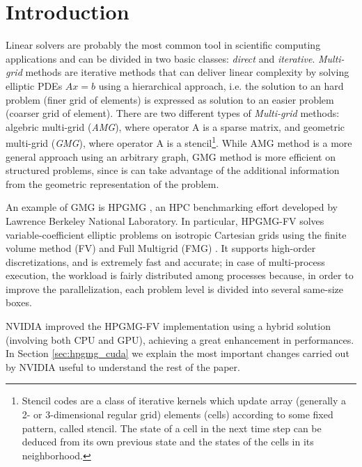 \documentclass[conference]{IEEEtran}
\begin{document}
\section{Introduction}\label{sec:introduction}
Linear solvers are probably the most common tool in scientific computing applications and can be divided in two basic classes: \emph{direct} and \emph{iterative}.
\emph{Multi-grid} methods are iterative methods that can deliver linear complexity by solving elliptic PDEs $Ax=b$ using a hierarchical approach, i.e. the solution to an hard problem (finer grid of elements) is expressed as solution to an easier problem (coarser grid of element).
There are two different types of \emph{Multi-grid} methods: algebric multi-grid (\emph{AMG}), where operator A is a sparse matrix, and geometric multi-grid (\emph{GMG}), where operator A is a stencil\footnote{Stencil codes are a class of iterative kernels which update array (generally a 2- or 3-dimensional regular grid) elements (cells) according to some fixed pattern, called stencil. The state of a cell in the next time step can be deduced from its own previous state and the states of the cells in its neighborhood.
}. While AMG method is a more general approach using an arbitrary graph, GMG method is more efficient on structured problems, since is can take advantage of the additional information from the geometric representation of the problem.

An example of GMG is HPGMG \cite{HPGMG}, an HPC benchmarking effort developed by Lawrence Berkeley National Laboratory. In particular, HPGMG-FV solves variable-coefficient elliptic problems on isotropic Cartesian grids using the finite volume method (FV) \cite{finitevolume} and Full Multigrid (FMG) \cite{fullmultigrid}. It supports high-order discretizations, and is extremely fast and accurate; in case of multi-process execution, the workload is fairly distributed among processes because, in order to improve the parallelization, each problem level is divided into several same-size boxes.

NVIDIA improved the HPGMG-FV implementation \cite{HPGMG_NVIDIA} using a hybrid solution (involving both CPU and GPU), achieving a great enhancement in performances. In Section \ref{sec:hpgmg_cuda} we explain the most important changes carried out by NVIDIA useful to understand the rest of the paper.
\end{document}
